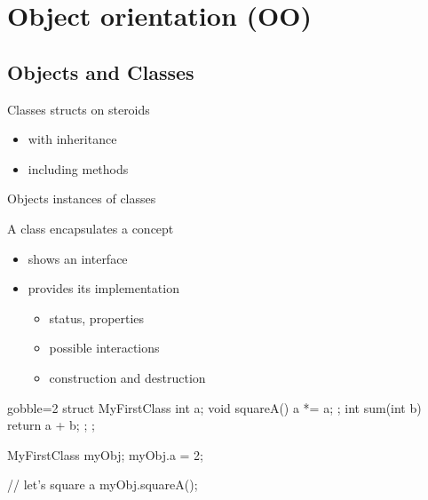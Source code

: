 \section[OO]{Object orientation (OO)}

\subsection[OO]{Objects and Classes}

\begin{frame}[fragile]
  \begin{block}{Classes}
    structs on steroids
    \begin{itemize}
    \item with inheritance
    \item including methods
    \end{itemize}
  \end{block}
  \begin{block}{Objects}
    instances of classes
  \end{block}
  \begin{block}{A class encapsulates a concept}
    \begin{itemize}
    \item shows an interface
    \item provides its implementation
      \begin{itemize}
      \item status, properties
      \item possible interactions
      \item construction and destruction
      \end{itemize}    
    \end{itemize}    
  \end{block}
\end{frame}


\begin{frame}[fragile]
  \begin{multicols}{2}
    \begin{cppcode*}{gobble=2}
      struct MyFirstClass {
        int a;
        void squareA() {
          a *= a;
        };
        int sum(int b) {
          return a + b;
        };
      };

      MyFirstClass myObj;
      myObj.a = 2;

      // let's square a
      myObj.squareA();
    \end{cppcode*}
    \columnbreak
    \center
    \null \vfill
    \vfill \null
  \end{multicols}
\end{frame}

